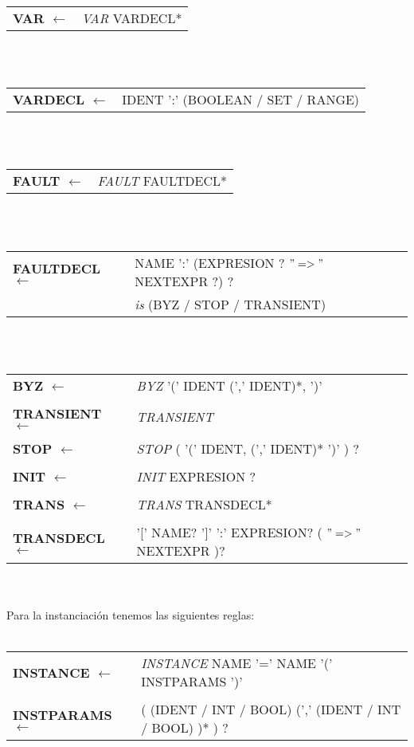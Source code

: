 \documentclass[titlepage, 12pt]{book}
\begin{document}
\begin{tabular}{>{\bfseries}ll}
VAR $\longleftarrow$ & \textit{VAR} VARDECL*
\end{tabular}
~\\\\
\begin{tabular}{>{\bfseries}ll}
VARDECL $\longleftarrow$ & IDENT ':' (BOOLEAN / SET / RANGE)
\end{tabular}
~\\\\
\begin{tabular}{>{\bfseries}ll}
FAULT $\longleftarrow$ & \textit{FAULT} FAULTDECL*
\end{tabular}
~\\\\
\begin{tabular}{>{\bfseries}ll}
FAULTDECL $\longleftarrow$ & NAME ':' (EXPRESION ? $"=>"$ NEXTEXPR ?) ? \\
						   & \textit{is} (BYZ / STOP / TRANSIENT)
\end{tabular}
~\\\\
\begin{tabular}{>{\bfseries}ll}
BYZ $\longleftarrow$ & \textit{BYZ} '(' IDENT (',' IDENT)*, ')'\\\\
TRANSIENT $\longleftarrow$ & \textit{TRANSIENT}\\\\
STOP $\longleftarrow$ & \textit{STOP} ( '(' IDENT, (',' IDENT)* ')' ) ?\\\\
INIT $\longleftarrow$ & \textit{INIT} EXPRESION ?\\\\
TRANS $\longleftarrow$ & \textit{TRANS} TRANSDECL*\\\\
TRANSDECL $\longleftarrow$ & '[' NAME? ']' ':' EXPRESION? ( $"=>"$ NEXTEXPR )?
\end{tabular}
~\\\\


Para la instanciaci\'on tenemos las siguientes reglas:\\\\

\noindent\begin{tabular}{>{\bfseries}ll}
INSTANCE $\longleftarrow$ & \textit{INSTANCE} NAME '=' NAME '(' INSTPARAMS ')'\\\\
INSTPARAMS $\longleftarrow$ & ( (IDENT / INT / BOOL) (',' (IDENT / INT / BOOL) )* ) ?
\end{tabular}
~\\\\
\end{document}
